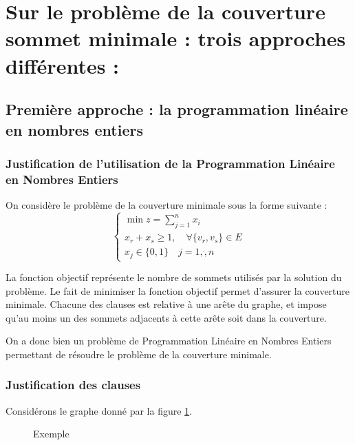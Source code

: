 \section{Sur le problème de la couverture sommet minimale : trois approches différentes :}

\subsection{Première approche : la programmation linéaire en nombres entiers}

\subsubsection{Justification de l'utilisation de la Programmation Linéaire en Nombres Entiers}

On considère le problème de la couverture minimale sous la forme suivante : $$
\left \lbrace \begin{array}{l}
	\min z = \sum_{j=1}^n x_i\\
	x_r + x_s \geq 1, \quad \forall \{v_r, v_s\} \in E \\
	x_j \in \{0,1\} \quad j = 1, \dot, n
\end{array} \right .
$$

La fonction objectif représente le nombre de sommets utilisés par la solution du problème. Le fait
de minimiser la fonction objectif permet d'assurer la couverture minimale. Chacune des clauses est
relative à une arête du graphe, et impose qu'au moins un des sommets adjacents à cette arête soit
dans la couverture.

On a donc bien un problème de Programmation Linéaire en Nombres Entiers permettant de résoudre le problème de la couverture minimale.

\subsubsection{Justification des clauses}

Considérons le graphe donné par la figure \ref{triangle}. 

\begin{figure}
	\begin{center}
	\end{center}
	\label{triangle}
	\caption{Exemple}
\end{figure}

